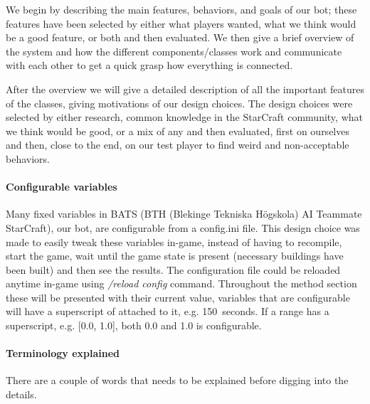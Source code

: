 We begin by describing the main features, behaviors, and goals of our bot; these features have been selected by either what players wanted, what we think would be a good feature, or both and then evaluated. We then give a brief overview of the system and how the different components/classes work and communicate with each other to get a quick grasp how everything is connected.

After the overview we will give a detailed description of all the important features of the classes, giving motivations of our design choices. The design choices were selected by either research, common knowledge in the StarCraft community, what we think would be good, or a mix of any and then evaluated, first on ourselves and then, close to the end, on our test player to find weird and non-acceptable behaviors.

\paragraph{Configurable variables}
Many fixed variables in BATS (BTH (Blekinge Tekniska Högskola) AI Teammate StarCraft), our bot, are configurable from a config.ini file. This design choice was made to easily tweak these variables in-game, instead of having to recompile, start the game, wait until the game state is present (necessary buildings have been built) and then see the results. The configuration file could be reloaded anytime in-game using \emph{/reload config} command. Throughout the method section these will be presented with their current value, variables that are configurable will have a superscript of \conf attached to it, e.g. 150\conf~seconds. If a range has a superscript, e.g. [0.0, 1.0]\conf, both 0.0 and 1.0 is configurable.

\paragraph{Terminology explained}
There are a couple of words that needs to be explained before digging into the details.

